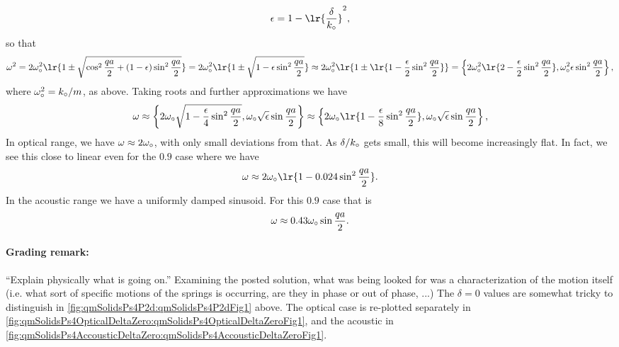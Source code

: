 {\begin{equation}
\epsilon = 1 - \lr{\frac{\delta}{k_\nought}}^2,
\end{equation}
%
so that
%
\begin{dmath}\label{eqn:condensedMatterProblemSet4Problem2:760}
\omega^2
= 2 \omega_\nought^2 \lr{ 1 \pm \sqrt{ \cos^2\frac{qa}{2} + (1 - \epsilon) \sin^2 \frac{qa}{2}} }
= 2 \omega_\nought^2 \lr{ 1 \pm \sqrt{ 1 - \epsilon \sin^2 \frac{qa}{2}} }
\approx 2 \omega_\nought^2 \lr{ 1 \pm \lr{ 1 - \frac{\epsilon}{2} \sin^2 \frac{qa}{2}} }
=
\left\{2 \omega_\nought^2 \lr{ 2 - \frac{\epsilon}{2} \sin^2 \frac{qa}{2} },
\omega_\nought^2 \epsilon \sin^2 \frac{qa}{2}
\right\},
\end{dmath}
%
where \(\omega_\circ^2 = k_\circ/m\), as above.  Taking roots and further approximations we have
%
\begin{dmath}\label{eqn:condensedMatterProblemSet4Problem2:780}
\omega
\approx
\left\{2 \omega_\nought \sqrt{ 1 - \frac{\epsilon}{4} \sin^2 \frac{qa}{2} },
\omega_\nought \sqrt{\epsilon} \sin \frac{qa}{2}
\right\}
\approx
\left\{
2 \omega_\nought \lr{ 1 - \frac{\epsilon}{8} \sin^2 \frac{qa}{2} },
\omega_\nought \sqrt{\epsilon} \sin \frac{qa}{2}
\right\},
\end{dmath}
%
In optical  range, we have \(\omega \approx 2 \omega_\circ\), with only small deviations from that.  As \(\delta/k_\circ\) gets small, this will become increasingly flat.  In fact, we see this close to linear even for the \(0.9\) case where we have
%
\begin{equation}\label{eqn:condensedMatterProblemSet4Problem2:800}
\omega \approx
2 \omega_\nought \lr{ 1 - 0.024 \sin^2 \frac{qa}{2} }.
\end{equation}
%
In the acoustic  range we have a uniformly damped sinusoid.  For this \(0.9\) case that is
%
\begin{equation}\label{eqn:condensedMatterProblemSet4Problem2:720}
\omega \approx 0.43 \omega_\circ \sin \frac{qa}{2}.
\end{equation}
%
\paragraph{Grading remark:} ``Explain physically what is going on.''  Examining the posted solution, what was being looked for was a characterization of the motion itself (i.e. what sort of specific motions of the springs is occurring, are they in phase or out of phase, ...)
The \(\delta = 0\) values are somewhat tricky to distinguish in \cref{fig:qmSolidsPs4P2d:qmSolidsPs4P2dFig1} above.  The optical case is re-plotted separately in \cref{fig:qmSolidsPs4OpticalDeltaZero:qmSolidsPs4OpticalDeltaZeroFig1}, and the acoustic in \cref{fig:qmSolidsPs4AccousticDeltaZero:qmSolidsPs4AccousticDeltaZeroFig1}.
%
}
